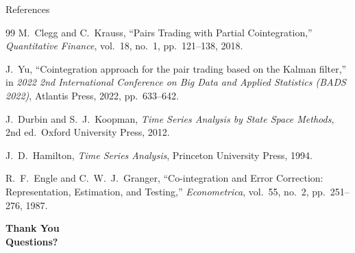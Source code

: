 \documentclass[10pt, aspectratio=169]{beamer}
\begin{document}
\begin{frame}{References}
  \small
  \begin{thebibliography}{99}
      M.~Clegg and C.~Krauss,
      ``Pairs Trading with Partial Cointegration,''
      \emph{Quantitative Finance}, vol.~18, no.~1, pp.~121--138, 2018.

      J.~Yu,
      ``Cointegration approach for the pair trading based on the Kalman filter,''
      in \emph{2022 2nd International Conference on Big Data and Applied Statistics (BADS 2022)}, Atlantis Press, 2022, pp.~633--642.

      J.~Durbin and S.~J.~Koopman,
      \emph{Time Series Analysis by State Space Methods},
      2nd ed.\ Oxford University Press, 2012.

      J.~D.~Hamilton,
      \emph{Time Series Analysis},
      Princeton University Press, 1994.

      R.~F.~Engle and C.~W.~J.~Granger,
      ``Co-integration and Error Correction: Representation, Estimation,
      and Testing,''
      \emph{Econometrica}, vol.~55, no.~2, pp.~251--276, 1987.
  \end{thebibliography}
\end{frame}

\begin{frame}{}
  \centering
  \Huge\bfseries Thank You\\[16pt]
  \Large Questions?
\end{frame}
\end{document}
